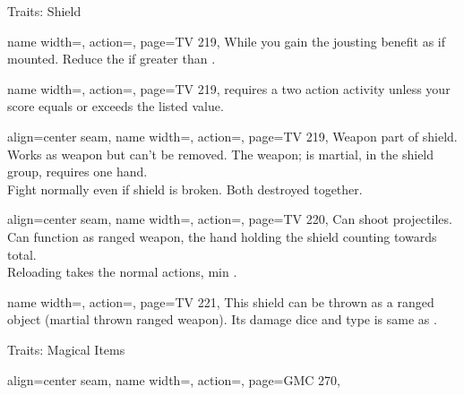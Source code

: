 \begin{PageBack}
\begin{Tables}{\backTableHeight}
\begin{Table}{Traits: Shield}
\begin{entry}{}{%
                name width=\conditionLength,%
                action=\Harnessed,
                page=TV 219,
            }
                While  you gain the jousting benefit as if mounted.
                Reduce the   \Feet if greater than  \Feet.
            \end{entry}
            \begin{entry}{}{%
                name width=\conditionLength,%
                action=\Hefty,
                page=TV 219,
            }
                 requires a two action activity unless your \Strength score equals or exceeds the listed value.
            \end{entry}
            \begin{entry}{}{%
                align=center seam,
                name width=\conditionLength,%
                action=\Integrated,
                page=TV 219,
            }
                Weapon part of shield.
                Works as  weapon but can't be removed.
                The weapon; is martial, in the shield group, requires one hand. \\
                Fight normally even if shield is broken.
                Both destroyed together.
            \end{entry}
            \begin{entry}{}{%
                align=center seam,
                name width=\conditionLength,%
                action=\Launching,
                page=TV 220,
            }
                Can shoot projectiles. Can function as ranged weapon, the hand holding the shield counting towards total.\\
                Reloading takes the normal  actions, min .
            \end{entry}
            \begin{entry}{}{%
                name width=\conditionLength,%
                action=\ShieldThrow,
                page=TV 221,
            }
                This shield can be thrown as a ranged object (martial thrown ranged weapon).
                Its damage dice and type is same as .
            \end{entry}
        \end{Table}
        \TableSpace
        \begin{Table}{Traits: Magical Items}
            \begin{entry}{}{%
                align=center seam,
                name width=\conditionLength,%
                action=\Apex,
                page=GMC 270,
            }

\end{entry}
\end{Table}
\end{Tables}
\end{PageBack}

